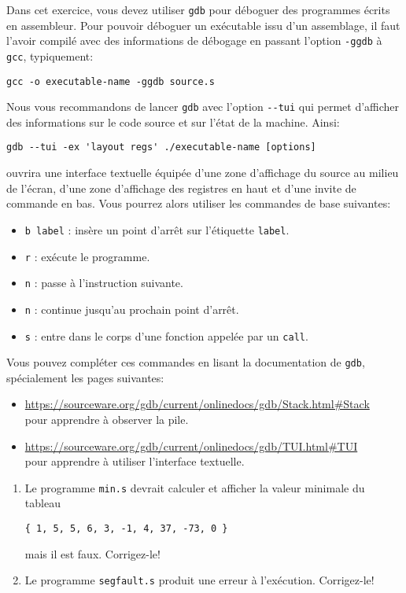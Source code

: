 \documentclass{article}
\begin{document}
\begin{exercise}
  \-
  Dans cet exercice, vous devez utiliser \verb!gdb! pour déboguer
  des programmes écrits en assembleur. Pour pouvoir déboguer un
  exécutable issu d'un assemblage, il faut l'avoir compilé avec des
  informations de débogage en passant l'option \verb!-ggdb! à \verb!gcc!,
  typiquement:
\begin{verbatim}
gcc -o executable-name -ggdb source.s
\end{verbatim}

Nous vous recommandons de lancer \verb!gdb! avec l'option \verb!--tui! qui
permet d'afficher des informations sur le code source et sur l'état de la
machine. Ainsi:
\begin{verbatim}
gdb --tui -ex 'layout regs' ./executable-name [options]
\end{verbatim}
ouvrira une interface textuelle équipée d'une zone d'affichage du
source au milieu de l'écran, d'une zone d'affichage des registres en
haut et d'une invite de commande en bas. Vous pourrez alors utiliser
les commandes de base suivantes:
\begin{itemize}
\item \verb!b label! : insère un point d'arrêt sur l'étiquette \verb!label!.
\item \verb!r! : exécute le programme.
\item \verb!n! : passe à l'instruction suivante.
\item \verb!n! : continue jusqu'au prochain point d'arrêt.
\item \verb!s! : entre dans le corps d'une fonction appelée par un \verb!call!.
\end{itemize}

\medskip

Vous pouvez compléter ces commandes en lisant la documentation de \verb!gdb!,
spécialement les pages suivantes:
\begin{itemize}
\item \url{https://sourceware.org/gdb/current/onlinedocs/gdb/Stack.html#Stack} \\ pour apprendre à observer la pile.
\item \url{https://sourceware.org/gdb/current/onlinedocs/gdb/TUI.html#TUI} \\ pour apprendre à utiliser l'interface textuelle.
\end{itemize}

\begin{enumerate}
\item
  Le programme \verb!min.s! devrait calculer et afficher la valeur minimale du tableau
\begin{center}
  \verb!{ 1, 5, 5, 6, 3, -1, 4, 37, -73, 0 }!
\end{center}
 mais il est faux. Corrigez-le!

\item
  Le programme \verb!segfault.s! produit une erreur à l'exécution. Corrigez-le!
\end{enumerate}

\end{exercise}
\end{document}
